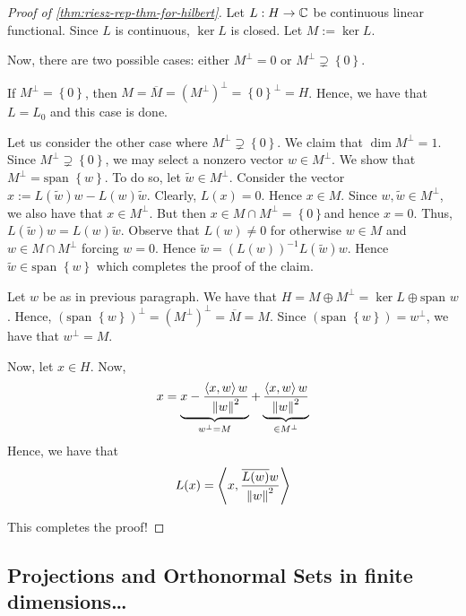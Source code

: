 \begin{proof}[Proof of \ref{thm:riesz-rep-thm-for-hilbert}]
    Let $L : H \to \mathbb C$ be continuous linear functional. Since $L$ is continuous, $\ker L$ is closed. Let $M:= \ker L$.

    Now, there are two possible cases: either $M^{\perp} = 0$ or $M^{\perp} \supsetneq \left\{ 0 \right\}$.

    If $M^{\perp} = \left\{ 0 \right\}$, then $M= \overline {M} = (M^{\perp})^{\perp} = \left\{ 0 \right\} ^{\perp} = H$. Hence, we have that $L = L_{0}$ and this case is done.

    Let us consider the other case where $M^{\perp} \supsetneq \left\{ 0 \right\}$. We claim that $\dim M^{\perp} = 1$. Since $M^{\perp} \supsetneq \left\{ 0 \right\}$, we may select a nonzero vector $w \in M^{\perp}$. We show that $M^{\perp} = \text{span } \left\{ w \right\}$. To do so, let $\tilde {w} \in M^{\perp}$. Consider the vector $x:= L\left( \tilde {w} \right) w - L(w) \tilde {w}$. Clearly, $L(x) = 0$. Hence $x \in M$. Since $w, \tilde{w} \in M^{\perp}$, we also have that $x \in M^{\perp}$. But then $x \in M \cap M^{\perp} = \left\{ 0 \right\}$and hence $x=0$. Thus, $L \left( \tilde w \right) w = L(w) \tilde w$. Observe that $L(w) \ne 0$ for otherwise $w \in M$ and $w \in M\cap M^{\perp}$ forcing $w = 0$. Hence $\tilde w = \left( L\left( w \right) \right)^{-1} L (\tilde w ) w$. Hence $\tilde w \in \text{span } \left\{ w \right\}$ which completes the proof of the claim.

    Let $w$ be as in previous paragraph. We have that $H = M \oplus M^{\perp} = \ker L \oplus \text{span } w$. Hence, $\left( \text{span } \left\{ w \right\} \right) ^{\perp} = (M^{\perp})^{\perp} = \overline {M} = M$. Since $\left( \text{span } \left\{ w \right\} \right) = w^{\perp}$, we have that $w^{\perp} = M$.

    Now, let $x\in H$. Now,
    \begin{equation*}
	x=\underbrace{x-\frac{\left\langle x,w \right\rangle w}{\left\lVert w \right\rVert^{2}}}_{w^{\perp}=M} + \underbrace{\frac{\left\langle x,w \right\rangle w}{\left\lVert w \right\rVert^{2}}}_{\in M^{\perp}}
    \end{equation*}
    Hence, we have that
    \begin{equation*}
	L(x)=\left\langle x, \frac{\overline {L(w)}w}{\left\lVert w \right\rVert ^{2}} \right\rangle
    \end{equation*}

    This completes the proof!
   \end{proof}

\subsection{Projections and Orthonormal Sets in finite dimensions\ldots}
